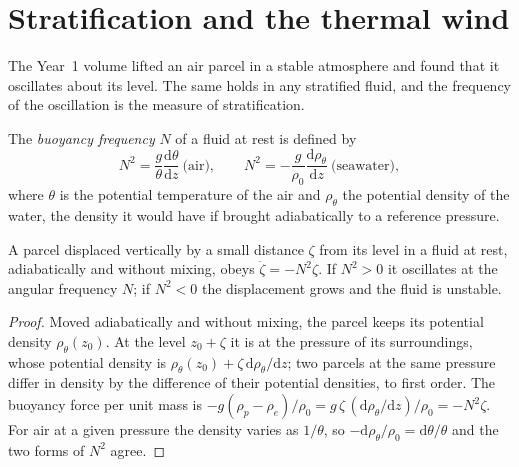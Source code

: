 \section{Stratification and the thermal wind}\label{sec:b3:gfd-foundations:stratification}

The Year~1 volume lifted an air parcel in a stable atmosphere and found
that it oscillates about its level. The same holds in any stratified fluid,
and the frequency of the oscillation is the measure of stratification.

\begin{definition}\label{def:b3:gfd-foundations:buoyancy}
The \emph{buoyancy frequency} $N$ of a fluid at
rest is defined by
\[
N^2 = \frac{g}{\theta}\frac{\mathrm d\theta}{\mathrm dz}\ \text{(air)},
\qquad
N^2 = -\frac{g}{\rho_0}\frac{\mathrm d\rho_\theta}{\mathrm dz}\ \text{(seawater)},
\]
where $\theta$ is the potential temperature of the air and $\rho_\theta$ the
potential density of the water, the density it would have if brought
adiabatically to a reference pressure.
\end{definition}

\begin{theorem}\label{thm:b3:gfd-foundations:buoyancy}
A parcel displaced vertically by a small distance $\zeta$ from its level in a
fluid at rest, adiabatically and without mixing, obeys $\ddot\zeta =
-N^2\zeta$. If $N^2 > 0$ it oscillates at the angular frequency $N$; if
$N^2 < 0$ the displacement grows and the fluid is unstable.
\end{theorem}

\begin{proof}
Moved adiabatically and without mixing, the parcel keeps its potential
density $\rho_\theta(z_0)$. At the level $z_0 + \zeta$ it is at the pressure
of its surroundings, whose potential density is $\rho_\theta(z_0) +
\zeta\,\mathrm d\rho_\theta/\mathrm dz$; two parcels at the same pressure
differ in density by the difference of their potential densities, to first
order. The buoyancy force per unit mass is $-g(\rho_p - \rho_e)/\rho_0 =
g\,\zeta\,(\mathrm d\rho_\theta/\mathrm dz)/\rho_0 = -N^2\zeta$. For air at a
given pressure the density varies as $1/\theta$, so $-\mathrm
d\rho_\theta/\rho_0 = \mathrm d\theta/\theta$ and the two forms of $N^2$
agree.
\end{proof}

